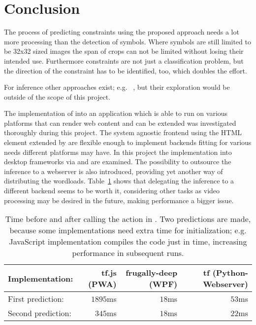 \section{Conclusion}

The process of predicting constraints using the proposed approach needs a lot more processing than the detection of symbols.
Where symbols are still limited to be 32x32 sized images the span of crops can not be limited without losing their intended use.
Furthermore constraints are not just a classification problem, but the direction of the constraint has to be identified, too, which doubles the effort.

For inference other approaches exist; e.g. ~\cite{Bochkovskiy2020}, but their exploration would be outside of the scope of this project.

The implementation of  into an application which is able to run on various platforms that can render web content and can be extended was investigated thoroughly during this project.
The system agnostic frontend using the  HTML element extended by  are flexible enough to implement backends fitting for various needs different platforms may have.
In this project the implementation into desktop frameworks via  and  are examined.
The possibility to outsource the inference to a webserver is also introduced, providing yet another way of distributing the wordloads.
Table~\ref{tab:benchmarks} shows that delegating the inference to a different backend seems to be worth it, considering other tasks as video processing may be desired in the future, making performance a bigger issue.

\begin{table}
    \label{tab:benchmarks}
    \caption{
        Time before and after calling the  action in .
        Two predictions are made, because some implementations need extra time for initialization; e.g. JavaScript implementation compiles the code just in time, increasing performance in subsequent runs.}
\begin{tabular}{lrrr}
    \toprule
    Implementation: & tf.js (PWA) & frugally-deep (WPF) & tf (Python-Webserver) \\
    \midrule
    First prediction: & \(1895\)ms & \(18\)ms & \(53\)ms \\
    \midrule
    Second prediction: & \(345\)ms & \(18\)ms & \(22\)ms \\
    \bottomrule
\end{tabular}
\end{table}

